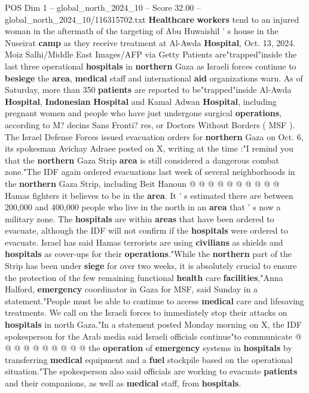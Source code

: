 \begin{textsample}{POS Dim 1 – global\_north\_2024\_10 – Score 32.00 – global\_north\_2024\_10/116315702.txt}  \label{ex:f1_pos_378}
\textbf{Healthcare} \textbf{workers} tend to an injured woman in the aftermath of the targeting of Abu Huwaishil ' s house in the Nuseirat \textbf{camp} as they receive treatment at Al-Awda \textbf{Hospital}, Oct. 13, 2024.
Moiz Salhi/Middle East Images/AFP via Getty Patients are"trapped"inside the last three operational \textbf{hospitals} in \textbf{northern} Gaza as Israeli forces continue to \textbf{besiege} the \textbf{area}, \textbf{medical} staff and international \textbf{aid} organizations warn.
As of Saturday, more than 350 \textbf{patients} are reported to be"trapped"inside Al-Awda \textbf{Hospital}, \textbf{Indonesian} \textbf{Hospital} and Kamal Adwan \textbf{Hospital}, including pregnant women and people who have just undergone surgical \textbf{operations}, according to M? decins Sans Fronti? res, or Doctors Without Borders ( MSF ).
The Israel Defense Forces issued evacuation orders for \textbf{northern} Gaza on Oct. 6, its spokesman Avichay Adraee posted on X, writing at the time :"I remind you that the \textbf{northern} Gaza Strip \textbf{area} is still considered a dangerous combat zone."The IDF again ordered evacuations last week of several neighborhoods in the \textbf{northern} Gaza Strip, including Beit Hanoun @ @ @ @ @ @ @ @ @ @ Hamas fighters it believes to be in the \textbf{area}.
It ' s estimated there are between 200,000 and 400,000 people who live in the north in an \textbf{area} that ' s now a military zone.
The \textbf{hospitals} are within \textbf{areas} that have been ordered to evacuate, although the IDF will not confirm if the \textbf{hospitals} were ordered to evacuate.
Israel has said Hamas terrorists are using \textbf{civilians} as shields and \textbf{hospitals} as cover-ups for their \textbf{operations}."While the \textbf{northern} part of the Strip has been under \textbf{siege} for over two weeks, it is absolutely crucial to ensure the protection of the few remaining functional \textbf{health} care \textbf{facilities},"Anna Halford, \textbf{emergency} coordinator in Gaza for MSF, said Sunday in a statement."People must be able to continue to access \textbf{medical} care and lifesaving treatments.
We call on the Israeli forces to immediately stop their attacks on \textbf{hospitals} in north Gaza."In a statement posted Monday morning on X, the IDF spokesperson for the Arab media said Israeli officials continue"to communicate @ @ @ @ @ @ @ @ @ @ the \textbf{operation} of \textbf{emergency} systems in \textbf{hospitals} by transferring \textbf{medical} equipment and a \textbf{fuel} stockpile based on the operational situation."The spokesperson also said officials are working to evacuate \textbf{patients} and their companions, as well as \textbf{medical} staff, from \textbf{hospitals}.

\end{textsample}
